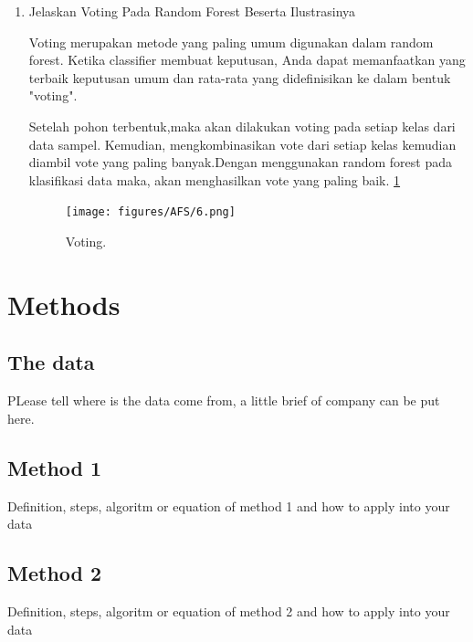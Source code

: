 \begin{enumerate}
\begin {enumerate}
Kemudian kita dapat mencari nilai Recall, Precision, accuracy dan Error Rate

 Recall =3/(1+3) = 0,75

 Precision = 3/(1+3) = 0,75

 Accuracy =(5+3)/(5+1+1+3) = 0,8

 Error Rate =(1+1)/(5+1+1+3) = 0,2

\end {enumerate}

\item Jelaskan Voting Pada Random Forest Beserta Ilustrasinya 
\par Voting merupakan metode yang paling umum digunakan dalam random forest. Ketika classifier membuat keputusan, Anda dapat memanfaatkan yang terbaik keputusan umum dan rata-rata yang didefinisikan ke dalam bentuk "voting".
\par Setelah pohon terbentuk,maka akan dilakukan voting pada setiap kelas dari data sampel. Kemudian, mengkombinasikan vote dari setiap kelas kemudian diambil vote yang paling banyak.Dengan menggunakan random forest pada klasifikasi data maka, akan menghasilkan vote yang paling baik. \ref{AFS6}
		\begin{figure}[ht]
		\centerline{\texttt{[image: figures/AFS/6.png]}}
		\caption{Voting.}
		\label{AFS6}
		\end{figure}
\end{enumerate}

\chapter{Methods}

\section{The data}
PLease tell where is the data come from, a little brief of company can be put here.

\section{Method 1}
Definition, steps, algoritm or equation of method 1 and how to apply into your data
\section{Method 2}
Definition, steps, algoritm or equation of method 2 and how to apply into your data

